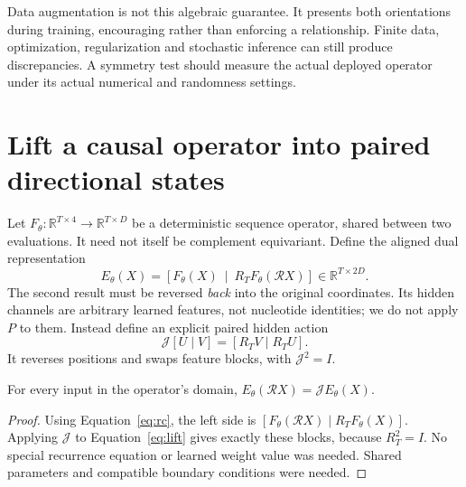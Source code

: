 Data augmentation is not this algebraic guarantee. It presents both
orientations during training, encouraging rather than enforcing a relationship.
Finite data, optimization, regularization and stochastic inference can still
produce discrepancies. A symmetry test should measure the actual deployed
operator under its actual numerical and randomness settings.

\section{Lift a causal operator into paired directional states}

Let $F_\theta:\mathbb R^{T\times4}\to\mathbb R^{T\times D}$ be a deterministic
sequence operator, shared between two evaluations. It need not itself be
complement equivariant. Define the aligned dual representation
\begin{equation}
 E_\theta(X)=
 \left[F_\theta(X)\ \middle|\ R_TF_\theta(\mathcal RX)\right]
 \in\mathbb R^{T\times2D}.
 \label{eq:lift}
\end{equation}
The second result must be reversed \emph{back} into the original coordinates.
Its hidden channels are arbitrary learned features, not nucleotide identities;
we do not apply $P$ to them. Instead define an explicit paired hidden action
\begin{equation}
 \mathcal J[U\mid V]=[R_TV\mid R_TU].
 \label{eq:pairedaction}
\end{equation}
It reverses positions and swaps feature blocks, with $\mathcal J^2=I$.

\begin{proposition}
For every input in the operator's domain,
$E_\theta(\mathcal RX)=\mathcal J E_\theta(X)$.
\end{proposition}
\begin{proof}
Using Equation~\ref{eq:rc}, the left side is
$[F_\theta(\mathcal RX)\mid R_TF_\theta(X)]$.
Applying $\mathcal J$ to Equation~\ref{eq:lift} gives exactly these blocks,
because $R_T^2=I$. No special recurrence equation or learned weight value
was needed. Shared parameters and compatible boundary conditions were needed.
\end{proof}


